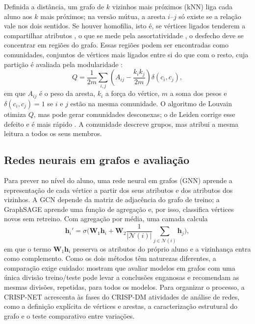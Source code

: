 Definida a distância, um grafo de $k$ vizinhos mais próximos (kNN) liga cada aluno aos $k$ mais próximos; na versão mútua, a aresta $i$--$j$ só existe se a relação vale nos dois sentidos. Se houver homofilia, isto é, se vértices ligados tenderem a compartilhar atributos \citep{mcpherson2001}, o que se mede pela assortatividade \citep{newman2003}, o desfecho deve se concentrar em regiões do grafo. Essas regiões podem ser encontradas como comunidades, conjuntos de vértices mais ligados entre si do que com o resto, cuja partição é avaliada pela modularidade \citep{newman2004}:
\begin{equation}
Q = \frac{1}{2m}\sum_{i,j}\left(A_{ij} - \frac{k_i k_j}{2m}\right)\delta(c_i, c_j),
\label{eq-modularidade}
\end{equation}
em que $A_{ij}$ é o peso da aresta, $k_i$ a força do vértice, $m$ a soma dos pesos e $\delta(c_i, c_j) = 1$ se $i$ e $j$ estão na mesma comunidade. O algoritmo de Louvain \citep{blondel2008} otimiza $Q$, mas pode gerar comunidades desconexas; o de Leiden corrige esse defeito e é mais rápido \citep{traag2019}. A comunidade descreve grupos, mas atribui a mesma leitura a todos os seus membros.

\subsection{Redes neurais em grafos e avaliação}

Para prever no nível do aluno, uma rede neural em grafos (GNN) aprende a representação de cada vértice a partir dos seus atributos e dos atributos dos vizinhos. A GCN \citep{kipf2017} depende da matriz de adjacência do grafo de treino; a GraphSAGE \citep{hamilton2017} aprende uma função de agregação e, por isso, classifica vértices novos sem retreino. Com agregação por média, uma camada calcula
\begin{equation}
\mathbf{h}_i' = \sigma\Big(\mathbf{W}_1\mathbf{h}_i + \mathbf{W}_2 \frac{1}{|\mathcal{N}(i)|}\sum_{j \in \mathcal{N}(i)} \mathbf{h}_j\Big),
\label{eq-sage}
\end{equation}
em que o termo $\mathbf{W}_1\mathbf{h}_i$ preserva os atributos do próprio aluno e a vizinhança entra como complemento. Como os dois métodos têm naturezas diferentes, a comparação exige cuidado: \cite{shchur2018} mostram que avaliar modelos em grafos com uma única divisão treino/teste pode levar a conclusões enganosas e recomendam as mesmas divisões, repetidas, para todos os modelos. Para organizar o processo, a CRISP-NET \citep{acunacid2025} acrescenta às fases do CRISP-DM atividades de análise de redes, como a definição explícita de vértices e arestas, a caracterização estrutural do grafo e o teste comparativo entre variações.
